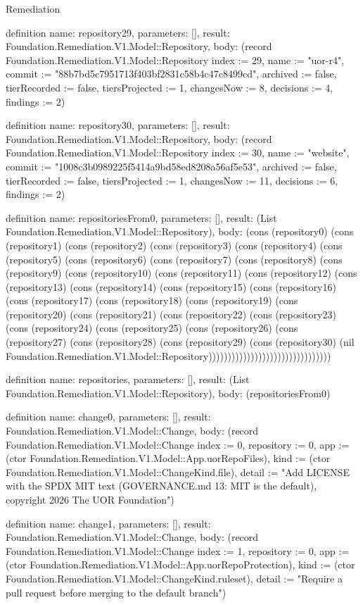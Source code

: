 \begin{lexlean}{Remediation}
\begin{semanticmodule}
definition{
  name: repository29,
  parameters: [],
  result: Foundation.Remediation.V1.Model::Repository,
  body: (record Foundation.Remediation.V1.Model::Repository {index := 29, name := "uor-r4", commit := "88b7bd5c7951713f403bf2831c58b4c47c8499cd", archived := false, tierRecorded := false, tiersProjected := 1, changesNow := 8, decisions := 4, findings := 2})
}

definition{
  name: repository30,
  parameters: [],
  result: Foundation.Remediation.V1.Model::Repository,
  body: (record Foundation.Remediation.V1.Model::Repository {index := 30, name := "website", commit := "1008c3b0989225f5414a9bd58ed8208a56af5e53", archived := false, tierRecorded := false, tiersProjected := 1, changesNow := 11, decisions := 6, findings := 2})
}

definition{
  name: repositoriesFrom0,
  parameters: [],
  result: (List Foundation.Remediation.V1.Model::Repository),
  body: (cons (repository0) (cons (repository1) (cons (repository2) (cons (repository3) (cons (repository4) (cons (repository5) (cons (repository6) (cons (repository7) (cons (repository8) (cons (repository9) (cons (repository10) (cons (repository11) (cons (repository12) (cons (repository13) (cons (repository14) (cons (repository15) (cons (repository16) (cons (repository17) (cons (repository18) (cons (repository19) (cons (repository20) (cons (repository21) (cons (repository22) (cons (repository23) (cons (repository24) (cons (repository25) (cons (repository26) (cons (repository27) (cons (repository28) (cons (repository29) (cons (repository30) (nil Foundation.Remediation.V1.Model::Repository))))))))))))))))))))))))))))))))
}

definition{
  name: repositories,
  parameters: [],
  result: (List Foundation.Remediation.V1.Model::Repository),
  body: (repositoriesFrom0)
}

definition{
  name: change0,
  parameters: [],
  result: Foundation.Remediation.V1.Model::Change,
  body: (record Foundation.Remediation.V1.Model::Change {index := 0, repository := 0, app := (ctor Foundation.Remediation.V1.Model::App.uorRepoFiles), kind := (ctor Foundation.Remediation.V1.Model::ChangeKind.file), detail := "Add LICENSE with the SPDX MIT text (GOVERNANCE.md 13: MIT is the default), copyright 2026 The UOR Foundation"})
}

definition{
  name: change1,
  parameters: [],
  result: Foundation.Remediation.V1.Model::Change,
  body: (record Foundation.Remediation.V1.Model::Change {index := 1, repository := 0, app := (ctor Foundation.Remediation.V1.Model::App.uorRepoProtection), kind := (ctor Foundation.Remediation.V1.Model::ChangeKind.ruleset), detail := "Require a pull request before merging to the default branch"})
}


\end{semanticmodule}
\end{lexlean}
